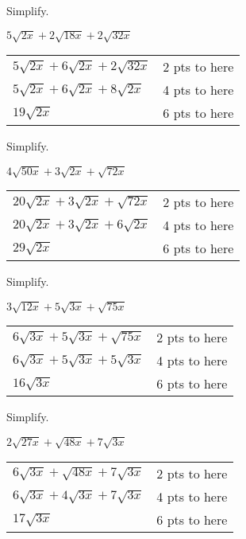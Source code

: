 {
	Simplify.\par
	$5\sqrt{2x} + 2\sqrt{18x} + 2\sqrt{32x}$
}
{
	\begin{tabular}{l r}
	$5\sqrt{2x}+6\sqrt{2x}+2\sqrt{32x}$ & 2 pts to here\\
	$5\sqrt{2x}+6\sqrt{2x}+8\sqrt{2x}$ & 4 pts to here\\
	$19\sqrt{2x}$ & 6 pts to here
	\end{tabular}
}

{
	Simplify.\par
	$4\sqrt{50x} + 3\sqrt{2x} + \sqrt{72x}$
}
{
	\begin{tabular}{l r}
	$20\sqrt{2x}+3\sqrt{2x}+\sqrt{72x}$ & 2 pts to here\\
	$20\sqrt{2x}+3\sqrt{2x}+6\sqrt{2x}$ & 4 pts to here\\
	$29\sqrt{2x}$ & 6 pts to here
	\end{tabular}
}

{
	Simplify.\par
	$3\sqrt{12x} + 5\sqrt{3x} + \sqrt{75x}$
}
{
	\begin{tabular}{l r}
	$6\sqrt{3x}+5\sqrt{3x}+\sqrt{75x}$ & 2 pts to here\\
	$6\sqrt{3x}+5\sqrt{3x}+5\sqrt{3x}$ & 4 pts to here\\
	$16\sqrt{3x}$ & 6 pts to here
	\end{tabular}
}

{
	Simplify.\par
	$2\sqrt{27x} + \sqrt{48x} + 7\sqrt{3x}$
}
{
	\begin{tabular}{l r}
	$6\sqrt{3x}+\sqrt{48x}+7\sqrt{3x}$ & 2 pts to here\\
	$6\sqrt{3x}+4\sqrt{3x}+7\sqrt{3x}$ & 4 pts to here\\
	$17\sqrt{3x}$ & 6 pts to here
	\end{tabular}
}

